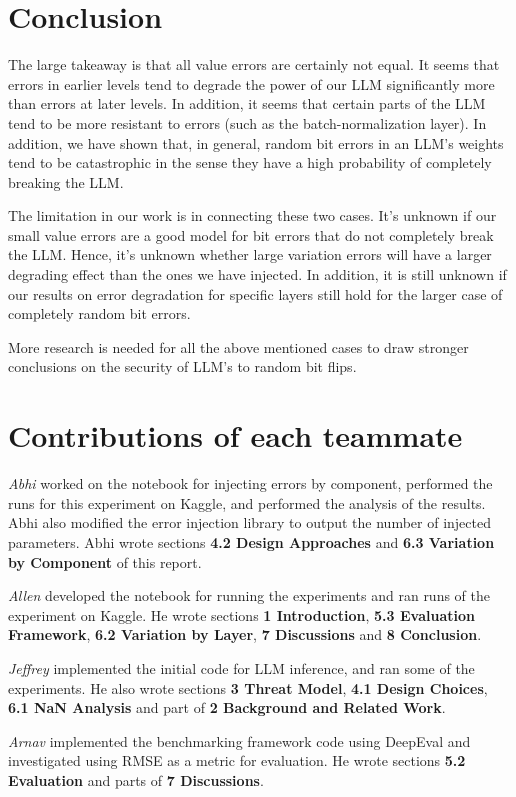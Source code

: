 \section{Conclusion}
\label{sec:conclusion}
The large takeaway is that all value errors are certainly not equal. It seems that errors in earlier levels tend to degrade the power of our LLM significantly more than errors at later levels.
In addition, it seems that certain parts of the LLM tend to be more resistant to errors (such as the batch-normalization layer). In addition, we have shown that, in general,
random bit errors in an LLM's weights tend to be catastrophic in the sense they have a high probability of completely breaking the LLM.

The limitation in our work is in connecting these two cases. It's unknown if our small value errors are a good model for bit errors that do not completely break the LLM. Hence, it's unknown whether
large variation errors will have a larger degrading effect than the ones we have injected. In addition, it is still unknown if our results on error degradation for specific layers still hold for
the larger case of completely random bit errors.

More research is needed for all the above mentioned cases to draw stronger conclusions on the security of LLM's to random bit flips.

\section{Contributions of each teammate}
\textit{Abhi} worked on the notebook for injecting errors by component, performed the runs for this experiment on Kaggle, and performed the analysis of the results. Abhi also modified the error injection library to output the number of injected parameters. Abhi wrote sections \textbf{4.2 Design Approaches} and \textbf{6.3 Variation by Component} of this report.

\textit{Allen} developed the notebook for running the experiments and ran runs of the experiment on Kaggle. He wrote sections \textbf{1 Introduction}, \textbf{5.3 Evaluation Framework}, \textbf{6.2 Variation by Layer}, \textbf{7 Discussions} and \textbf{8 Conclusion}.

\textit{Jeffrey} implemented the initial code for LLM inference, and ran some of the experiments. He also wrote sections \textbf{3 Threat Model}, \textbf{4.1 Design Choices}, \textbf{6.1 NaN Analysis} and part of \textbf{2 Background and Related Work}.

\textit{Arnav} implemented the benchmarking framework code using DeepEval and investigated using RMSE as a metric for evaluation. He wrote sections \textbf{5.2 Evaluation} and parts of \textbf{7 Discussions}.


